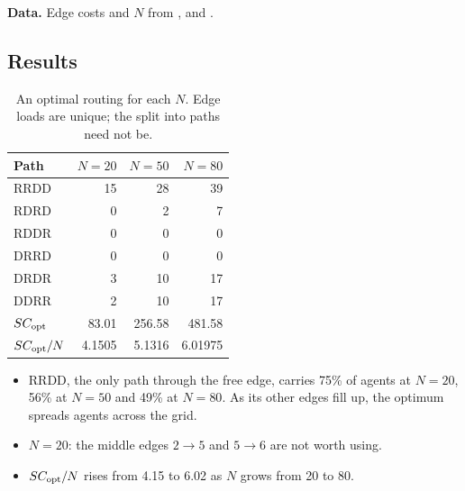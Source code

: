 \documentclass[11pt]{article}
\begin{document}
\textbf{Data.} Edge costs and $N$ from ,  and
.

\subsection{Results}

\begin{table}[H]
\centering
\begin{tabular}{@{}lrrr@{}}
\toprule
Path & $N = 20$ & $N = 50$ & $N = 80$ \\
\midrule
RRDD & 15 & 28 & 39 \\
RDRD & 0  & 2  & 7  \\
RDDR & 0  & 0  & 0  \\
DRRD & 0  & 0  & 0  \\
DRDR & 3  & 10 & 17 \\
DDRR & 2  & 10 & 17 \\
\midrule
$SC_{\mathrm{opt}}$   & 83.01  & 256.58 & 481.58  \\
$SC_{\mathrm{opt}}/N$ & 4.1505 & 5.1316 & 6.01975 \\
\bottomrule
\end{tabular}
\caption{An optimal routing for each $N$. Edge loads are unique; the split into paths need not be.}
\end{table}

\begin{itemize}
  \item RRDD, the only path through the free edge, carries 75\% of agents at $N = 20$, 56\% at $N = 50$
        and 49\% at $N = 80$. As its other edges fill up, the optimum spreads agents across the grid.
  \item $N = 20$: the middle edges $2 \to 5$ and $5 \to 6$ are not worth using.
  \item $SC_{\mathrm{opt}}/N$ rises from 4.15 to 6.02 as $N$ grows from 20 to 80.
\end{itemize}
\end{document}

